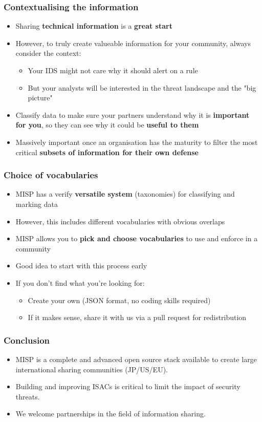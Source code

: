 \begin{frame}
\frametitle{Contextualising the information}
\begin{itemize}
    \item Sharing {\bf technical information} is a {\bf great start}
	\item However, to truly create valueable information for your community, always consider the context:
	\begin{itemize}
		\item Your IDS might not care why it should alert on a rule
		\item But your analysts will be interested in the threat landscape and the "big picture"
	\end{itemize}
    \item Classify data to make sure your partners understand why it is {\bf important for you}, so they can see why it could be {\bf useful to them}
    \item Massively important once an organisation has the maturity to filter the most critical {\bf subsets of information for their own defense}
\end{itemize}
\end{frame}

\begin{frame}
\frametitle{Choice of vocabularies}
\begin{itemize}
    \item MISP has a verify {\bf versatile system} (taxonomies) for classifying and marking data
	\item However, this includes different vocabularies with obvious overlaps
    \item MISP allows you to {\bf pick and choose vocabularies} to use and enforce in a community
	\item Good idea to start with this process early
	\item If you don't find what you're looking for:
	\begin{itemize}
		\item Create your own (JSON format, no coding skills required)
		\item If it makes sense, share it with us via a pull request for redistribution
	\end{itemize}
\end{itemize}
\end{frame}

\begin{frame}
\frametitle{Conclusion}
    \begin{itemize}
        \item MISP is a complete and advanced open source stack available to create large international sharing communities (JP/US/EU).
        \item Building and improving ISACs is critical to limit the impact of security threats.
        \item We welcome partnerships in the field of information sharing.
    \end{itemize}
\end{frame}


